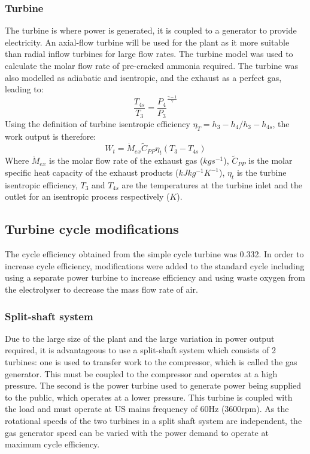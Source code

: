 \subsubsection{Turbine} \label{ssec:turbine}
The turbine is where power is generated, it is coupled to a generator to provide electricity. An axial-flow turbine will be used for the plant as it more suitable than radial inflow turbines for large flow rates. The turbine model was used to calculate the molar flow rate of pre-cracked ammonia required. The turbine was also modelled as adiabatic and isentropic, and the exhaust as a perfect gas, leading to: 
\begin{equation}
\frac{T_{4s}}{T_{3}} = \frac{P_4}{P_3}^{\frac{\gamma -1}{\gamma}}
\end{equation}
Using the definition of turbine isentropic efficiency $\eta_T = {h_3 - h_4}/{h_3 - h_{4s}}$, the work output is therefore:
\begin{equation}
W_t = \dot{M}_{ex} \tilde{C}_{PP} \eta_t  (T_3 - T_{4s})
\end{equation}
Where $\dot{M}_{ex}$ is the molar flow rate of the exhaust gas ($kg s^{-1}$), $\tilde{C}_{PP}$ is the molar specific heat capacity of the exhaust products ($kJ kg^{-1} K^{-1}$), $\eta_t$ is the turbine isentropic efficiency, $T_3$ and $T_{4s}$ are the temperatures at the turbine inlet and the outlet for an isentropic process respectively ($K$). 

\subsection{Turbine cycle modifications }
The cycle efficiency obtained from the simple cycle turbine was 0.332. In order to increase cycle efficiency, modifications were added to the standard cycle including using a separate power turbine to increase efficiency and using waste oxygen from the electrolyser to decrease the mass flow rate of air. 

\subsubsection{Split-shaft system}
Due to the large size of the plant and the large variation in power output required, it is advantageous to use a split-shaft system which consists of 2 turbines: one is used to transfer work to the compressor, which is called the gas generator. This must be coupled to the compressor and operates at a high pressure. The second is the power turbine used to generate power being supplied to the public, which operates at a lower pressure. This turbine is coupled with the load and must operate at US mains frequency of 60Hz (3600rpm). As the rotational speeds of the two turbines in a split shaft system are independent, the gas generator speed can be varied with the power demand to operate at maximum cycle efficiency. \cite{thermonotes} %

